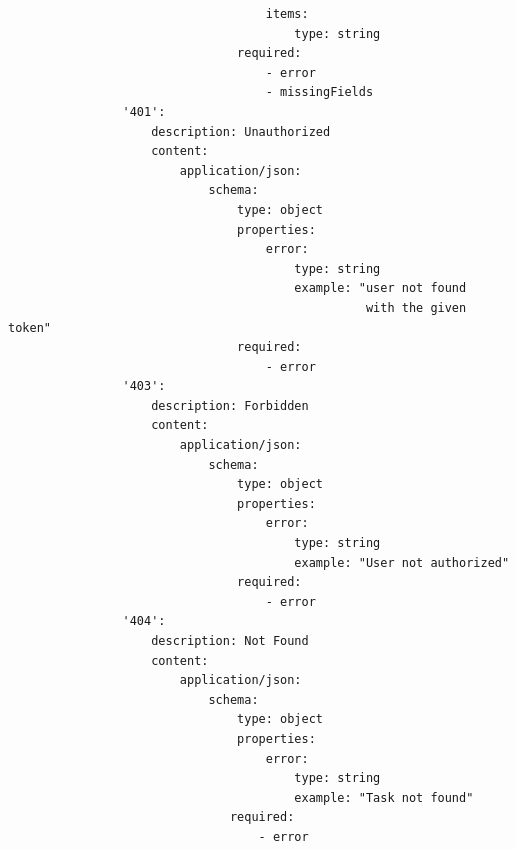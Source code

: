\documentclass{report}
\begin{document}
\begin{verbatim}
                                    items:
                                        type: string
                                required:
                                    - error
                                    - missingFields
                '401':
                    description: Unauthorized
                    content:
                        application/json:
                            schema:
                                type: object
                                properties:
                                    error:
                                        type: string
                                        example: "user not found
                                                  with the given token"
                                required:
                                    - error
                '403':
                    description: Forbidden
                    content:
                        application/json:
                            schema:
                                type: object
                                properties:
                                    error:
                                        type: string
                                        example: "User not authorized"
                                required:
                                    - error
                '404':
                    description: Not Found
                    content:
                        application/json:
                            schema:
                                type: object
                                properties:
                                    error:
                                        type: string
                                        example: "Task not found"
                               required:
                                   - error
\end{verbatim}
\end{document}

